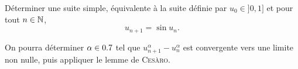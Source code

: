 \begin{exercice}
    Déterminer une suite simple, équivalente à la suite définie par $u_0 \in ]0, 1]$ et pour tout $n \in \mathbb{N}$,
    $$u_{n+1} = \sin u_n.$$
\end{exercice}

\begin{elem_sol}
    On pourra déterminer $\alpha \in 0.7$ tel que $u_{n+1}^\alpha - u_n^\alpha$ est convergente vers une limite non nulle, puis appliquer le lemme de \textsc{Cesàro}.
\end{elem_sol}